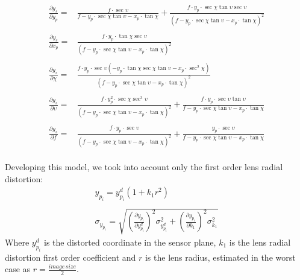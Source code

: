 \begin{equation*}
  \begin{array}{rl}
    \frac{
      \partial y_s}{\partial y_p} = &
          \frac{f\cdot\sec\upsilon}{f -y_p\cdot\sec\chi\tan\upsilon - x_p\cdot\tan\chi} +
          \frac{f\cdot y_p\cdot \sec\chi\tan\upsilon\sec\upsilon}{\left( f -y_p\cdot\sec\chi\tan\upsilon - x_p\cdot\tan\chi \right)^2} \\~\\
      \frac{\partial y_s}{\partial x_p} = &
          \frac{f\cdot y_p\cdot \tan\chi\sec\upsilon}{\left( f -y_p\cdot\sec\chi\tan\upsilon - x_p\cdot\tan\chi \right)^2} \\~\\
      \frac{\partial y_s}{\partial \chi} = &
          \frac{f\cdot y_p\cdot \sec\upsilon \left( -y_p\cdot \tan\chi\sec\chi\tan\upsilon - x_p\cdot\sec^2\chi \right)}{\left( f -y_p\cdot\sec\chi\tan\upsilon - x_p\cdot\tan\chi \right)^2} \\~\\
      \frac{\partial y_s}{\partial \upsilon} = &
          \frac{f\cdot y_p^2\cdot \sec\chi\sec^3\upsilon}{ \left( f -y_p\cdot\sec\chi\tan\upsilon - x_p\cdot\tan\chi \right)^2} +
          \frac{f\cdot y_p\cdot \sec\upsilon\tan\upsilon}{f -y_p\cdot\sec\chi\tan\upsilon - x_p\cdot\tan\chi} \\~\\
      \frac{\partial y_s}{\partial f} = &
          \frac{f\cdot y_p\cdot \sec\upsilon}{ \left( f -y_p\cdot\sec\chi\tan\upsilon - x_p\cdot\tan\chi \right)^2} +
          \frac{y_p\cdot \sec\upsilon}{f -y_p\cdot\sec\chi\tan\upsilon - x_p\cdot\tan\chi}
  \end{array}
\end{equation*} \\

Developing this model, we took into account only the first order lens radial distortion:
  \begin{equation}
  	\label{app:eq:sensor_to_camera_distortion}
    \begin{matrix}
      y_{p_i} = y_{p_i}^{d} \left( 1 + k_1r^2 \right) \\~\\
      \sigma_{y_{p_i}} = \sqrt{
        \left( \frac{\partial y_{p_i}}{\partial y_{p_i}^d} \right)^2 \sigma_{y_{p_i}^d}^2
        + \left( \frac{\partial y_{p_i}}{\partial k_1} \right)^2 \sigma_{k_1}^2
      }
    \end{matrix}
  \end{equation}
Where $y_{p_i}^d$ is the distorted coordinate in the sensor plane, $k_1$ is the lens radial distortion first order coefficient and $r$ is the lens radius, estimated in the worst case as $r = \frac{image \, size}{2}$. \\

